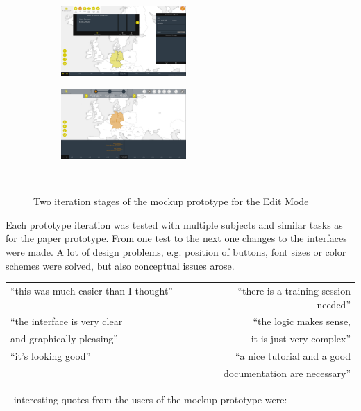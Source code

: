 \begin{figure}[ht]
  \centering
  \begin{subfigure}[b]{.5\textwidth}
    \centering
    \includegraphics[width=180px]{graphics/development/user_interface_design_process/mockup_prototype_1.png}
  \end{subfigure}%
  \begin{subfigure}[b]{.5\textwidth}
    \centering
    \includegraphics[width=180px]{graphics/development/user_interface_design_process/mockup_prototype_3.png}
  \end{subfigure} \\[0.8em]
  \caption{Two iteration stages of the mockup prototype for the Edit Mode}
  \label{fig:mockup_prototypes}
\end{figure}

Each prototype iteration was tested with multiple subjects and similar tasks as for the paper prototype. From one test to the next one changes to the interfaces were made. A lot of design problems, e.g. position of buttons, font sizes or color schemes were solved, but also conceptual issues arose.

\begin{quoteit}
  \begin{tabular}{l r}
    ``this was much easier than I thought'' ~~~~~~~~ &
    ``there is a training session needed'' \\[0.5em]
    ``the interface is very clear &
    ``the logic makes sense, \\
    and graphically pleasing'' &
    it is just very complex'' \\[0.5em]
    ``it's looking good'' &
    ``a nice tutorial and a good \\
    & documentation are necessary'' \\
  \end{tabular}
\end{quoteit}
\vspace{-1em}
\hfill -- interesting quotes from the users of the mockup prototype were:

